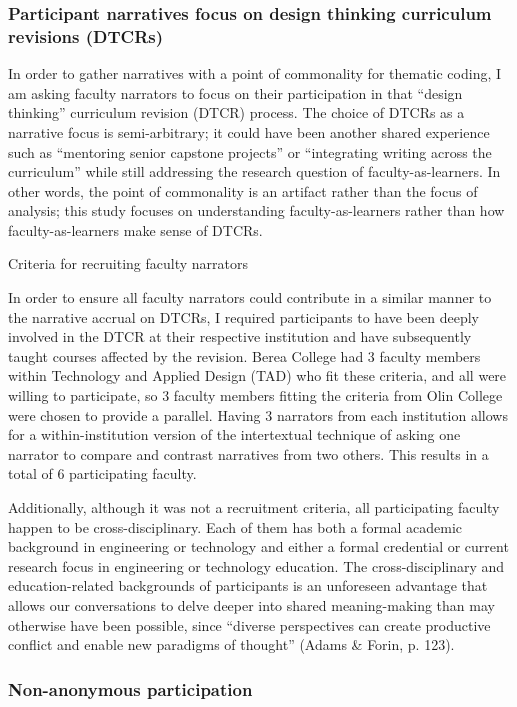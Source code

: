 \subsubsection{Participant narratives focus on design thinking curriculum revisions (DTCRs)}

In order to gather narratives with a point of commonality for thematic coding, I am asking faculty narrators to focus on their participation in that “design thinking” curriculum revision (DTCR) process. The choice of DTCRs as a narrative focus is semi-arbitrary; it could have been another shared experience such as “mentoring senior capstone projects” or “integrating writing across the curriculum” while still addressing the research question of faculty-as-learners. In other words, the point of commonality is an artifact rather than the focus of analysis; this study focuses on understanding faculty-as-learners rather than how faculty-as-learners make sense of DTCRs.

Criteria for recruiting faculty narrators

In order to ensure all faculty narrators could contribute in a similar manner to the narrative accrual on DTCRs, I required participants to have been deeply involved in the DTCR at their respective institution and have subsequently taught courses affected by the revision. Berea College had 3 faculty members within Technology and Applied Design (TAD) who fit these criteria, and all were willing to participate, so 3 faculty members fitting the criteria from Olin College were chosen to provide a parallel. Having 3 narrators from each institution allows for a within-institution version of the intertextual technique of asking one narrator to compare and contrast narratives from two others. This results in a total of 6 participating faculty.

Additionally, although it was not a recruitment criteria, all participating faculty happen to be cross-disciplinary. Each of them has both a formal academic background in engineering or technology and either a formal credential or current research focus in engineering or technology education. The cross-disciplinary and education-related backgrounds of participants is an unforeseen advantage that allows our conversations to delve deeper into shared meaning-making than may otherwise have been possible, since “diverse perspectives can create productive conflict and enable new paradigms of thought” (Adams & Forin, p. 123).

\subsubsection{Non-anonymous participation}

